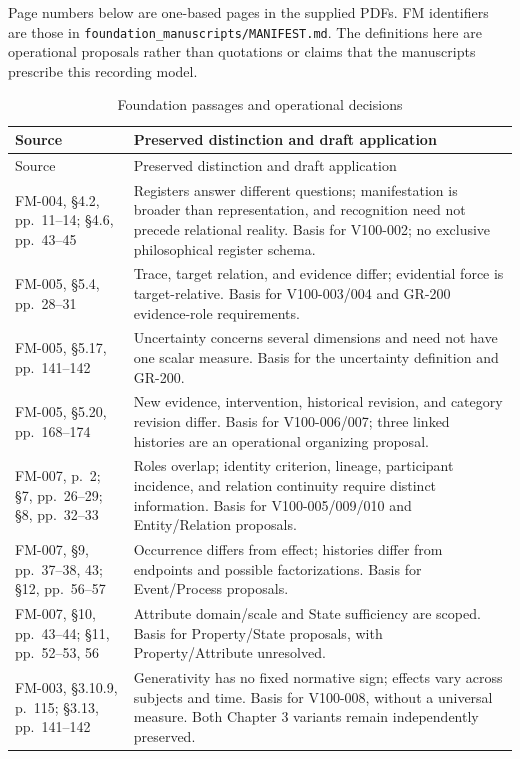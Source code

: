 \documentclass[11pt,a4paper]{article}
\begin{document}
Page numbers below are one-based pages in the supplied PDFs. FM identifiers are those in \texttt{foundation\_manuscripts/MANIFEST.md}. The definitions here are operational proposals rather than quotations or claims that the manuscripts prescribe this recording model.

\begin{longtable}{@{}L{0.28\textwidth}L{0.62\textwidth}@{}}
\caption{Foundation passages and operational decisions}\label{tab:gr100-t}\\
\toprule
Source & Preserved distinction and draft application \\
\midrule\endfirsthead
\toprule
Source & Preserved distinction and draft application \\
\midrule\endhead
FM-004, \S4.2, pp.~11--14; \S4.6, pp.~43--45 & Registers answer different questions; manifestation is broader than representation, and recognition need not precede relational reality. Basis for V100-002; no exclusive philosophical register schema. \\
FM-005, \S5.4, pp.~28--31 & Trace, target relation, and evidence differ; evidential force is target-relative. Basis for V100-003/004 and GR-200 evidence-role requirements. \\
FM-005, \S5.17, pp.~141--142 & Uncertainty concerns several dimensions and need not have one scalar measure. Basis for the uncertainty definition and GR-200. \\
FM-005, \S5.20, pp.~168--174 & New evidence, intervention, historical revision, and category revision differ. Basis for V100-006/007; three linked histories are an operational organizing proposal. \\
FM-007, p.~2; \S7, pp.~26--29; \S8, pp.~32--33 & Roles overlap; identity criterion, lineage, participant incidence, and relation continuity require distinct information. Basis for V100-005/009/010 and Entity/Relation proposals. \\
FM-007, \S9, pp.~37--38, 43; \S12, pp.~56--57 & Occurrence differs from effect; histories differ from endpoints and possible factorizations. Basis for Event/Process proposals. \\
FM-007, \S10, pp.~43--44; \S11, pp.~52--53, 56 & Attribute domain/scale and State sufficiency are scoped. Basis for Property/State proposals, with Property/Attribute unresolved. \\
FM-003, \S3.10.9, p.~115; \S3.13, pp.~141--142 & Generativity has no fixed normative sign; effects vary across subjects and time. Basis for V100-008, without a universal measure. Both Chapter 3 variants remain independently preserved. \\
\bottomrule
\end{longtable}
\end{document}
